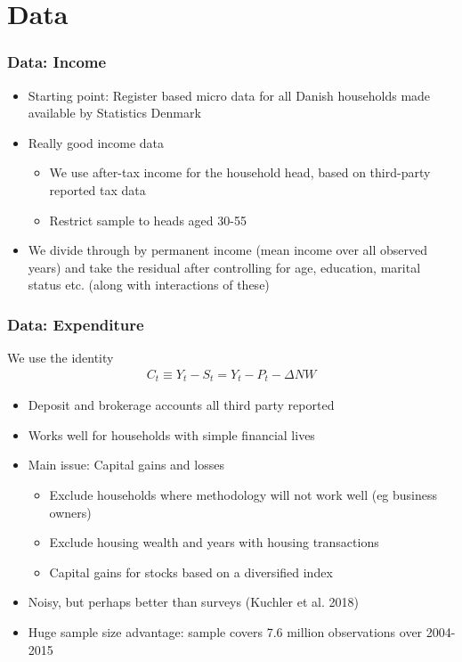 \documentclass{beamer}
\begin{document}
\section{Data}
\frame
{
	\frametitle{Data: Income}
	\begin{itemize}
		\item Starting point: Register based micro data for all Danish households made available by Statistics Denmark
		\item Really good income data
		\begin{itemize}
			\item We use after-tax income for the household head, based on third-party reported tax data
			\item Restrict sample to heads aged 30-55
		\end{itemize}
		\item We divide through by permanent income (mean income over all observed years) and take the residual after controlling for age, education, marital status etc. (along with interactions of these)
	\end{itemize}
}
\frame
{
	\frametitle{Data: Expenditure}
	We use the identity
		\begin{align*}
			C_t \equiv Y_t - S_t = Y_t - P_t - \Delta NW
		\end{align*}
	\begin{itemize}
		\item Deposit and brokerage accounts all third party reported
		\item Works well for households with simple financial lives
		\item Main issue: Capital gains and losses
		\begin{itemize}
			\item Exclude households where methodology will not work well (eg business owners)
			\item Exclude housing wealth and years with housing transactions
			\item Capital gains for stocks based on a diversified index
		\end{itemize}
		\item Noisy, but perhaps better than surveys (Kuchler et al. 2018)
		\item Huge sample size advantage: sample covers 7.6 million observations over 2004-2015
	\end{itemize}
}
\end{document}
